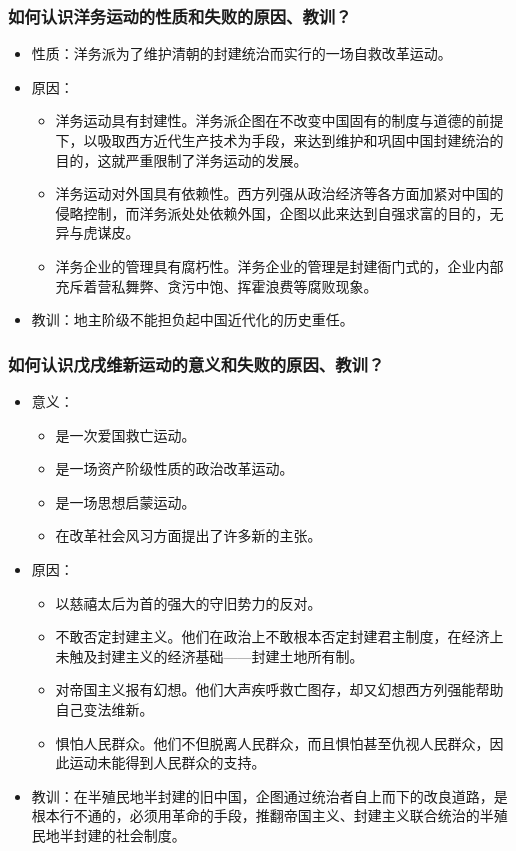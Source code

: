 \documentclass{article}
\begin{document}
\subsubsection{如何认识洋务运动的性质和失败的原因、教训？}
\begin{itemize}
    \item 性质：洋务派为了维护清朝的封建统治而实行的一场自救改革运动。
    \item 原因：
    \begin{itemize}
        \item 洋务运动具有封建性。洋务派企图在不改变中国固有的制度与道德的前提下，以吸取西方近代生产技术为手段，来达到维护和巩固中国封建统治的目的，这就严重限制了洋务运动的发展。
        \item 洋务运动对外国具有依赖性。西方列强从政治经济等各方面加紧对中国的侵略控制，而洋务派处处依赖外国，企图以此来达到自强求富的目的，无异与虎谋皮。
        \item 洋务企业的管理具有腐朽性。洋务企业的管理是封建衙门式的，企业内部充斥着营私舞弊、贪污中饱、挥霍浪费等腐败现象。
    \end{itemize}
    \item 教训：地主阶级不能担负起中国近代化的历史重任。
\end{itemize}

\subsubsection{如何认识戊戌维新运动的意义和失败的原因、教训？}
\begin{itemize}
    \item 意义：
    \begin{itemize}
        \item 是一次爱国救亡运动。
        \item 是一场资产阶级性质的政治改革运动。
        \item 是一场思想启蒙运动。
        \item 在改革社会风习方面提出了许多新的主张。
    \end{itemize}
    \item 原因：
    \begin{itemize}
        \item 以慈禧太后为首的强大的守旧势力的反对。
        \item 不敢否定封建主义。他们在政治上不敢根本否定封建君主制度，在经济上未触及封建主义的经济基础——封建土地所有制。
        \item 对帝国主义报有幻想。他们大声疾呼救亡图存，却又幻想西方列强能帮助自己变法维新。
        \item 惧怕人民群众。他们不但脱离人民群众，而且惧怕甚至仇视人民群众，因此运动未能得到人民群众的支持。
    \end{itemize}
    \item 教训：在半殖民地半封建的旧中国，企图通过统治者自上而下的改良道路，是根本行不通的，必须用革命的手段，推翻帝国主义、封建主义联合统治的半殖民地半封建的社会制度。
\end{itemize}
\end{document}
